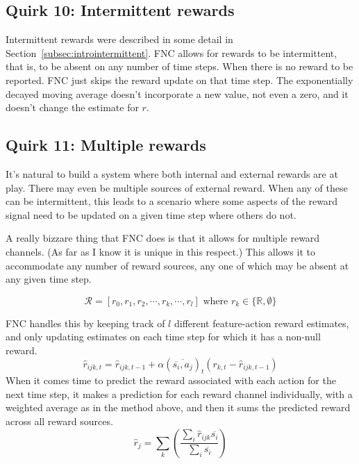\subsection*{Quirk 10: Intermittent rewards}
\label{algointermittentrewards}

Intermittent rewards were described in some detail in
Section~\ref{subsec:introintermittent}. FNC allows for rewards to be intermittent,
that is, to be absent on any number of time steps. When there is no reward
to be reported. FNC just skips the reward update on that time step. 
The exponentially decayed moving average doesn't incorporate a new value,
not even a zero, and it doesn't change the estimate for $r$.

\subsection*{Quirk 11: Multiple rewards}
\label{algomultiplerewards}

It’s natural to build a system where both internal and external rewards are at play.
There may even be multiple sources of external reward. When any of these
can be intermittent, this leads to a scenario
where some aspects of the reward signal need to be updated on a given time step
where others do not.

A really bizzare thing that FNC does is that it allows for multiple reward channels. 
(As far as I know it is unique in this respect.)
This allows it to accommodate any number of reward sources, any one of which
may be absent at any given time step.

\begin{equation}
\mathcal{R} = [r_0, r_1, r_2, \cdots, r_k, \cdots, r_l]
\mbox{ where } r_k \in \{\mathbb{R}, \emptyset\}
\end{equation}

FNC handles this by keeping track of $l$ different feature-action reward 
estimates, and only updating estimates on each time step for which it
has a non-null reward.
\begin{equation}
\hat{r}_{ijk, t} = \hat{r}_{ijk, t-1} + \alpha
(\overline{\overline{s_i}, a_j})_t
(r_{k,t} - \hat{r}_{ijk, t-1})
\end{equation}
When it comes time to predict the reward associated
with each action for the next time step, it makes a prediction for each
reward channel individually, with a weighted average as in the method above,
and then it sums the predicted reward across all reward sources.
\begin{equation}
\hat{r}_{j} = \sum_k \left ( \frac{\sum_i \hat{r}_{ijk} \overline{s_i}}
{\sum_i \overline{s_i}} \right )
\end{equation}

